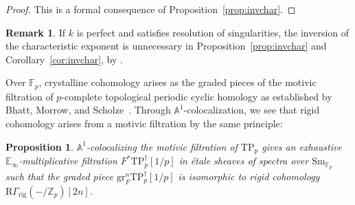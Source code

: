 \documentclass{amsart}
\numberwithin{equation}{section}
\theoremstyle{plain}
\newtheorem{proposition}[equation]{Proposition}
\theoremstyle{definition}
\newtheorem{remark}[equation]{Remark}
\let\bb=\mathbb
\def\Z{\bb Z}
\def\F{\bb F}
\def\A{\bb A}
\def\ph{\mathord-}
\def\E{\mathbb{E}}
\let\cat=\mathrm
\def\Sm{{\cat{S}\mathrm{m}}}
\def\gr{\mathrm{gr}}
\def\rig{\mathrm{rig}}
\newcommand{\TP}{\mathrm{TP}}
\begin{document}
\begin{proof}
This is a formal consequence of Proposition~\ref{prop:invchar}.
\end{proof}

\begin{remark}
If $k$ is perfect and satisfies resolution of singularities, the inversion of the characteristic exponent is unnecessary in Proposition~\ref{prop:invchar} and Corollary~\ref{cor:invchar}, by \cite[Théorème 1.4]{Riou}.
\end{remark}

Over $\F_p$, crystalline cohomology arises as the graded pieces of the motivic filtration of $p$-complete topological periodic cyclic homology as established by Bhatt, Morrow, and Scholze~\cite[Theorem 1.12(4)]{BMS}.
Through $\A^1$-colocalization, we see that rigid cohomology arises from a motivic filtration by the same principle:

\begin{proposition}\label{prop:tp}
$\A^1$-colocalizing the motivic filtration of $\TP_p$ gives an exhaustive $\E_\infty$-multiplicative filtration $F^*\TP_p^\dagger[1/p]$ in étale sheaves of spectra over $\Sm_{\F_p}$ such that the graded piece $\gr_F^n\TP_p^\dagger[1/p]$ is isomorphic to rigid cohomology $\mathrm{R}\Gamma_\rig(\ph/\Z_p)[2n]$.
\end{proposition}
\end{document}
